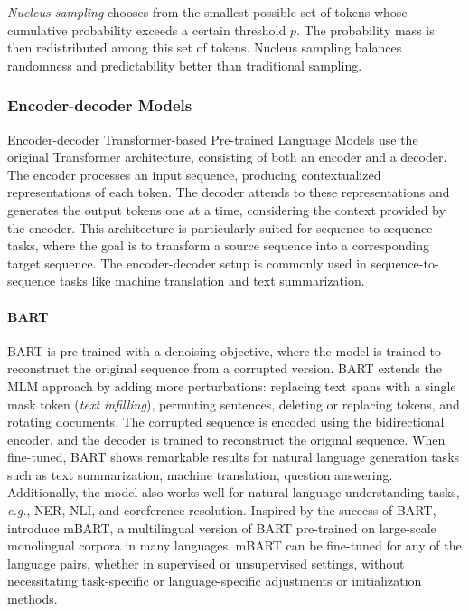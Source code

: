 \textit{Nucleus sampling} chooses from the smallest possible set of tokens whose
cumulative probability exceeds a certain threshold $p$. The probability mass
is then redistributed among this set of tokens. Nucleus sampling balances randomness and predictability better than traditional sampling.

\subsubsection{Encoder-decoder Models}

Encoder-decoder Transformer-based Pre-trained Language Models use the original Transformer architecture, consisting of both an encoder and a decoder. The encoder processes an input sequence, producing contextualized representations of each token. The decoder attends to these representations and generates the output tokens one at a time, considering the context provided by the encoder. This architecture is particularly suited for sequence-to-sequence tasks, where the goal is to transform a source sequence into a corresponding target sequence. The encoder-decoder setup is commonly used in sequence-to-sequence tasks like machine translation and text summarization.

\paragraph{BART} \ac{BART} \citep{lewis2019bart} is pre-trained with a denoising objective, where the model is trained to reconstruct the original sequence from a corrupted version. \ac{BART} extends the \ac{MLM} approach by adding more perturbations: replacing text spans with a single mask token (\textit{text infilling}), permuting sentences, deleting or replacing tokens, and rotating documents. The corrupted sequence is encoded using the bidirectional encoder, and the decoder is trained to reconstruct the original sequence. When fine-tuned, \ac{BART} shows remarkable results for natural language generation tasks such as text summarization, machine translation, question answering. Additionally, the model also works well for natural language understanding tasks, \textit{e.g.}, \ac{NER}, \ac{NLI}, and coreference resolution. Inspired by the success of \ac{BART}, \citet{liu2020multilingual} introduce mBART, a multilingual version of \ac{BART} pre-trained on large-scale monolingual corpora in many languages. mBART can be fine-tuned for any of the language pairs, whether in supervised or unsupervised settings, without necessitating task-specific or language-specific adjustments or initialization methods.

